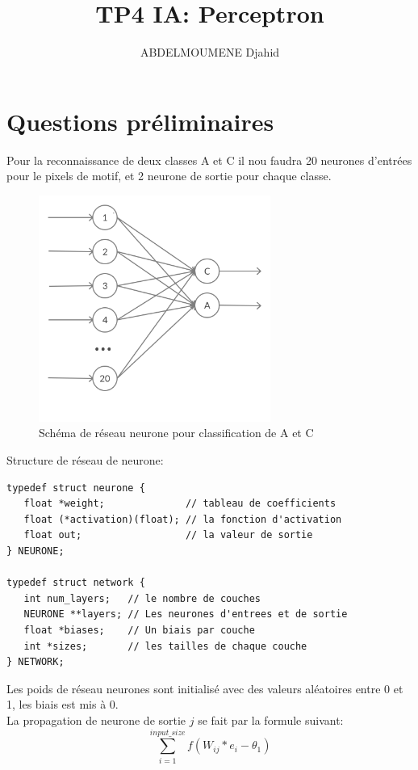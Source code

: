 \documentclass {article}
\title{TP4 IA: Perceptron}
\author{ABDELMOUMENE Djahid}
\begin{document}
\maketitle

\section{Questions préliminaires}
Pour la reconnaissance de deux classes A et C il nou faudra 20 neurones
d'entrées pour le pixels de motif, et 2 neurone de sortie pour chaque classe.
\begin{figure}[H]
   \centering
   \includegraphics[height=20em]{ACrn.png}
   \caption{Schéma de réseau neurone pour classification de A et C}
\end{figure}

Structure de réseau de neurone:
\begin{lstlisting}
typedef struct neurone {
   float *weight;              // tableau de coefficients 
   float (*activation)(float); // la fonction d'activation
   float out;                  // la valeur de sortie
} NEURONE;

typedef struct network {
   int num_layers;   // le nombre de couches
   NEURONE **layers; // Les neurones d'entrees et de sortie
   float *biases;    // Un biais par couche
   int *sizes;       // les tailles de chaque couche
} NETWORK;
\end{lstlisting}

Les poids de réseau neurones sont initialisé avec des valeurs aléatoires entre
0 et 1, les biais est mis à 0.\\

La propagation de neurone de sortie $j$ se fait par la formule suivant:
\begin{equation}
   \sum^{input\_size}_{i=1} f(W_{i j} * e_{i} - \theta_{1})
\end{equation}
\end{document}
